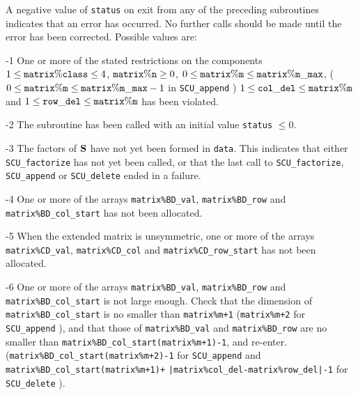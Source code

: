 \documentclass{galahad}
\newcommand{\packagename}{SCU}
\begin{document}

\galerrors
A negative value of {\tt status} on exit from any of the preceding subroutines
indicates that an error has occurred. No further calls should be made
until the error has been corrected. Possible values are:

\begin{description}

\item{-1} One or more of the stated restrictions on the components
$1 \leq  {\tt  matrix\%class} \leq 4$,
${\tt matrix\%n} \geq 0$,
$0 \leq {\tt matrix\%m} \\ \leq {\tt matrix\%m\_max}$,
($0 \leq {\tt matrix\%m} \leq {\tt matrix\%m\_max}-1$ in
{\tt \packagename\_append} )
$1 \leq {\tt col\_del} \leq {\tt matrix\%m}$ and
$1 \leq {\tt row\_del} \leq {\tt matrix\%m}$
has been violated.

\item{-2} The subroutine has been called with an initial value {\tt status}
$\leq 0$.

\item{-3} The factors of ${\mathbf{S}}$ have not yet been formed in {\tt data}.
This indicates that either
{\tt \packagename\_factorize} has not yet been called, or that the last call to
{\tt \packagename\_factorize}, {\tt \packagename\_append} or
{\tt \packagename\_delete}
ended in a failure.

\item{-4} One or more of the arrays {\tt matrix\%BD\_val},
{\tt matrix\%BD\_row} and
{\tt matrix\%BD\_col\_start} has not been allocated.

\item{-5} When the extended matrix is unsymmetric, one or more of the arrays
{\tt matrix\%CD\_val}, {\tt matrix\%CD\_col} and
{\tt matrix\%CD\_row\_start} has not been allocated.

\item{-6} One or more of the arrays {\tt matrix\%BD\_val},
{\tt matrix\%BD\_row} and
{\tt matrix\%BD\_col\_start} is not large enough. Check that the dimension
of {\tt matrix\%BD\_col\_start} is no smaller than
{\tt matrix\%m+1}
({\tt matrix\%m+2} for {\tt \packagename\_a\-pp\-end} ),
and that those of
{\tt matrix\%BD\_val} and {\tt matrix\%BD\_row} are no smaller than
{\tt matrix\%BD\_col\_start(mat\-rix\%m+1)-1}, and re-enter.
({\tt matrix\%BD\_col\_start(matrix\%m+2)-1} for {\tt \packagename\_append}
and {\tt matrix\%BD\_col\_st\-art(matrix\%m+1)+}
{\tt |matrix\%col\_del-matrix\%row\_del|-1} for {\tt \packagename\_delete} ).


\end{description}
\end{document}
